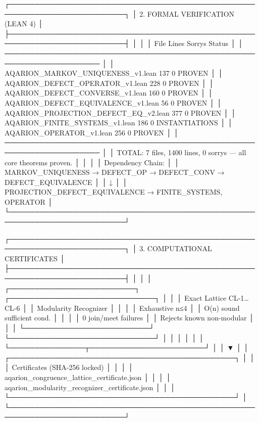 {{{{{{{{{{{{{┌─────────────────────────────────────────────────────────────────────────┐
│                  2. FORMAL VERIFICATION (LEAN 4)                        │
├─────────────────────────────────────────────────────────────────────────┤
│                                                                         │
│   File                               Lines   Sorrys   Status            │
│   ───────────────────────────────────────────────────────────────────── │
│   AQARION_MARKOV_UNIQUENESS_v1.lean    137       0      PROVEN          │
│   AQARION_DEFECT_OPERATOR_v1.lean      228       0      PROVEN          │
│   AQARION_DEFECT_CONVERSE_v1.lean      160       0      PROVEN          │
│   AQARION_DEFECT_EQUIVALENCE_v1.lean    56       0      PROVEN          │
│   AQARION_PROJECTION_DEFECT_EQ_v2.lean 377       0      PROVEN          │
│   AQARION_FINITE_SYSTEMS_v1.lean       186       0      INSTANTIATIONS  │
│   AQARION_OPERATOR_v1.lean             256       0      PROVEN          │
│   ───────────────────────────────────────────────────────────────────── │
│   TOTAL: 7 files, 1400 lines, 0 sorrys — all core theorems proven.    │
│                                                                         │
│   Dependency Chain:                                                     │
│   MARKOV_UNIQUENESS → DEFECT_OP → DEFECT_CONV → DEFECT_EQUIVALENCE     │
│           ↓                                                             │
│   PROJECTION_DEFECT_EQUIVALENCE → FINITE_SYSTEMS, OPERATOR              │
└─────────────────────────────────────────────────────────────────────────┘

┌─────────────────────────────────────────────────────────────────────────┐
│                  3. COMPUTATIONAL CERTIFICATES                          │
├─────────────────────────────────────────────────────────────────────────┤
│                                                                         │
│   ┌─────────────────────────┐          ┌─────────────────────────────┐ │
│   │ Exact Lattice CL-1…CL-6 │          │ Modularity Recognizer        │ │
│   │ Exhaustive n≤4          │          │ O(n) sound sufficient cond.  │ │
│   │ 0 join/meet failures    │          │ Rejects known non-modular    │ │
│   └─────────────────────────┘          └─────────────────────────────┘ │
│              │                                       │                  │
│              └───────────────┬───────────────────────┘                  │
│                              ▼                                          │
│              ┌─────────────────────────────────────────────┐            │
│              │ Certificates (SHA-256 locked)               │            │
│              │ aqarion_congruence_lattice_certificate.json │            │
│              │ aqarion_modularity_recognizer_certificate.json │         │
│              └─────────────────────────────────────────────┘            │
└─────────────────────────────────────────────────────────────────────────┘

}}}}}}}}}}}}}
